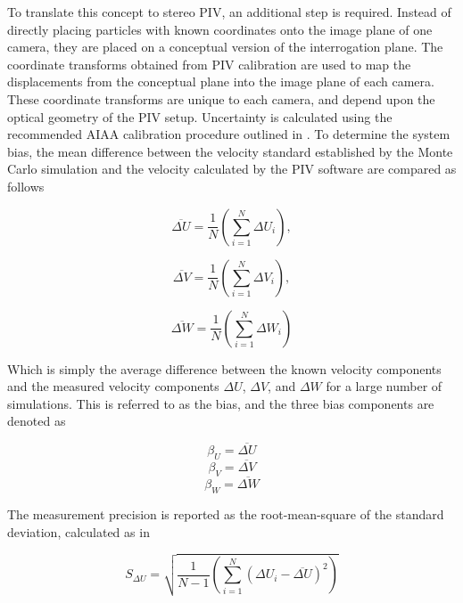 To translate this concept to stereo PIV, an additional step is required. 
Instead of directly placing particles with known coordinates onto the image 
plane of one camera, they are placed on a conceptual version of the 
interrogation plane. The coordinate transforms obtained from PIV calibration 
are used to map the displacements from the conceptual plane into the image 
plane of each camera. These coordinate transforms are unique to each camera, 
and depend upon the optical geometry of the PIV setup. Uncertainty is 
calculated using the recommended AIAA calibration procedure outlined in 
\cite{PIVuncertAIAA}. To determine the system bias, the mean difference between 
the velocity standard established by the Monte Carlo simulation and the 
velocity calculated by the PIV software are compared as follows

\begin{equation}
\overline{\Delta U} = \frac{1}{N} \left(\sum_{i=1}^N \Delta U_i \right),
\label{eq:Uerror}
\end{equation}

\begin{equation}
\overline{\Delta V} = \frac{1}{N} \left(\sum_{i=1}^N \Delta V_i \right),
\label{eq:Verror}
\end{equation}

\begin{equation}
\overline{\Delta W} = \frac{1}{N} \left(\sum_{i=1}^N \Delta W_i \right)
\label{eq:Werror}
\end{equation}

Which is simply the average difference between the known velocity components 
and the measured velocity components $\Delta U$, $\Delta V$, and $\Delta W$ for 
a large number of simulations. This is referred to as the bias, and the three 
bias components are denoted as

\begin{equation}
\beta_{U} = \overline{\Delta U}
\label{eq:Ubias}
\end{equation}
\begin{equation}
\beta_{V} = \overline{\Delta V}
\label{eq:Vbias}
\end{equation}
\begin{equation}
\beta_{W} = \overline{\Delta W}
\label{eq:Wbias}
\end{equation}

The measurement precision is reported as the root-mean-square of the  
standard deviation, calculated as in 
	
\begin{equation}
S_{\Delta U} = \sqrt{\frac{1}{N-1} \left(\sum_{i=1}^N (\Delta U_i - 
\overline{\Delta U})^2 \right)}
\label{eq:Usd}
\end{equation}

